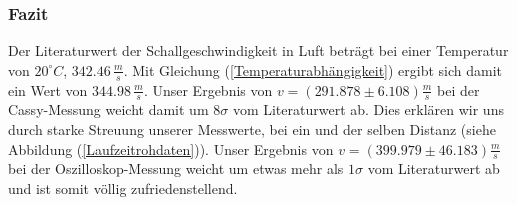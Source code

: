 \documentclass[12pt,a4paper]{article}
\begin{document}
\subsubsection{Fazit}
Der Literaturwert der Schallgeschwindigkeit in Luft beträgt bei einer Temperatur von $20^{\circ}C$, $342.46\, \frac{m}{s}$. Mit Gleichung (\ref{Temperaturabhängigkeit}) ergibt sich damit ein Wert von $344.98 \, \frac{m}{s}$.
Unser Ergebnis von $v=(291.878 \pm 6.108) \frac{m}{s}$ bei der Cassy-Messung weicht damit um $8\sigma$ vom Literaturwert ab. Dies erklären wir uns durch starke Streuung unserer Messwerte, bei ein und der selben Distanz (siehe Abbildung (\ref{Laufzeitrohdaten})). \newline
Unser Ergebnis von $v=(399.979 \pm 46.183)\frac{m}{s}$ bei der Oszilloskop-Messung weicht um etwas mehr als $1\sigma$ vom Literaturwert ab und ist somit völlig zufriedenstellend.
\end{document}
